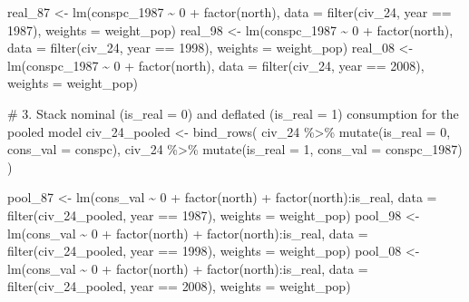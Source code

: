 \documentclass[
  letterpaper,
  DIV=11,
  numbers=noendperiod]{scrartcl}
\newenvironment{Shaded}{\begin{snugshade}}{\end{snugshade}}
\newcommand{\AttributeTok}[1]{\textcolor[rgb]{0.40,0.45,0.13}{#1}}
\newcommand{\CommentTok}[1]{\textcolor[rgb]{0.37,0.37,0.37}{#1}}
\newcommand{\DecValTok}[1]{\textcolor[rgb]{0.68,0.00,0.00}{#1}}
\newcommand{\FunctionTok}[1]{\textcolor[rgb]{0.28,0.35,0.67}{#1}}
\newcommand{\NormalTok}[1]{\textcolor[rgb]{0.00,0.23,0.31}{#1}}
\newcommand{\OtherTok}[1]{\textcolor[rgb]{0.00,0.23,0.31}{#1}}
\newcommand{\SpecialCharTok}[1]{\textcolor[rgb]{0.37,0.37,0.37}{#1}}
\begin{document}
\begin{Shaded}
\begin{Highlighting}[]
\NormalTok{real\_87 }\OtherTok{\textless{}{-}} \FunctionTok{lm}\NormalTok{(conspc\_1987 }\SpecialCharTok{\textasciitilde{}} \DecValTok{0} \SpecialCharTok{+} \FunctionTok{factor}\NormalTok{(north), }\AttributeTok{data =} \FunctionTok{filter}\NormalTok{(civ\_24, year }\SpecialCharTok{==} \DecValTok{1987}\NormalTok{), }\AttributeTok{weights =}\NormalTok{ weight\_pop)}
\NormalTok{real\_98 }\OtherTok{\textless{}{-}} \FunctionTok{lm}\NormalTok{(conspc\_1987 }\SpecialCharTok{\textasciitilde{}} \DecValTok{0} \SpecialCharTok{+} \FunctionTok{factor}\NormalTok{(north), }\AttributeTok{data =} \FunctionTok{filter}\NormalTok{(civ\_24, year }\SpecialCharTok{==} \DecValTok{1998}\NormalTok{), }\AttributeTok{weights =}\NormalTok{ weight\_pop)}
\NormalTok{real\_08 }\OtherTok{\textless{}{-}} \FunctionTok{lm}\NormalTok{(conspc\_1987 }\SpecialCharTok{\textasciitilde{}} \DecValTok{0} \SpecialCharTok{+} \FunctionTok{factor}\NormalTok{(north), }\AttributeTok{data =} \FunctionTok{filter}\NormalTok{(civ\_24, year }\SpecialCharTok{==} \DecValTok{2008}\NormalTok{), }\AttributeTok{weights =}\NormalTok{ weight\_pop)}

\CommentTok{\# 3. Stack nominal (is\_real = 0) and deflated (is\_real = 1) consumption for the pooled model}
\NormalTok{civ\_24\_pooled }\OtherTok{\textless{}{-}} \FunctionTok{bind\_rows}\NormalTok{(}
\NormalTok{  civ\_24 }\SpecialCharTok{\%\textgreater{}\%} \FunctionTok{mutate}\NormalTok{(}\AttributeTok{is\_real =} \DecValTok{0}\NormalTok{, }\AttributeTok{cons\_val =}\NormalTok{ conspc),}
\NormalTok{  civ\_24 }\SpecialCharTok{\%\textgreater{}\%} \FunctionTok{mutate}\NormalTok{(}\AttributeTok{is\_real =} \DecValTok{1}\NormalTok{, }\AttributeTok{cons\_val =}\NormalTok{ conspc\_1987)}
\NormalTok{)}

\NormalTok{pool\_87 }\OtherTok{\textless{}{-}} \FunctionTok{lm}\NormalTok{(cons\_val }\SpecialCharTok{\textasciitilde{}} \DecValTok{0} \SpecialCharTok{+} \FunctionTok{factor}\NormalTok{(north) }\SpecialCharTok{+} \FunctionTok{factor}\NormalTok{(north)}\SpecialCharTok{:}\NormalTok{is\_real,}
              \AttributeTok{data =} \FunctionTok{filter}\NormalTok{(civ\_24\_pooled, year }\SpecialCharTok{==} \DecValTok{1987}\NormalTok{), }\AttributeTok{weights =}\NormalTok{ weight\_pop)}
\NormalTok{pool\_98 }\OtherTok{\textless{}{-}} \FunctionTok{lm}\NormalTok{(cons\_val }\SpecialCharTok{\textasciitilde{}} \DecValTok{0} \SpecialCharTok{+} \FunctionTok{factor}\NormalTok{(north) }\SpecialCharTok{+} \FunctionTok{factor}\NormalTok{(north)}\SpecialCharTok{:}\NormalTok{is\_real,}
              \AttributeTok{data =} \FunctionTok{filter}\NormalTok{(civ\_24\_pooled, year }\SpecialCharTok{==} \DecValTok{1998}\NormalTok{), }\AttributeTok{weights =}\NormalTok{ weight\_pop)}
\NormalTok{pool\_08 }\OtherTok{\textless{}{-}} \FunctionTok{lm}\NormalTok{(cons\_val }\SpecialCharTok{\textasciitilde{}} \DecValTok{0} \SpecialCharTok{+} \FunctionTok{factor}\NormalTok{(north) }\SpecialCharTok{+} \FunctionTok{factor}\NormalTok{(north)}\SpecialCharTok{:}\NormalTok{is\_real,}
              \AttributeTok{data =} \FunctionTok{filter}\NormalTok{(civ\_24\_pooled, year }\SpecialCharTok{==} \DecValTok{2008}\NormalTok{), }\AttributeTok{weights =}\NormalTok{ weight\_pop)}


\end{Highlighting}
\end{Shaded}
\end{document}
